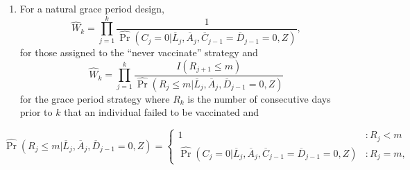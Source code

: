 \begin{appendices}
\begin{refsection}
\begin{enumerate}
\begin{enumerate}
\begin{enumerate}
                \item For a natural grace period design,
                $$\widehat{W}_k = \prod_{j = 1}^k \frac{1}{\widehat{\Pr}(C_j  = 0|\overline{L}_j, \overline{A}_j, \overline{C}_{j-1} = \overline{D}_{j-1} = 0, Z)},$$
                for those assigned to the ``never vaccinate'' strategy and
                $$\widehat{W}_k = \prod_{j = 1}^k \frac{I(R_{j+1} \leq m)}{\widehat{\Pr}(R_j \leq m | \overline{L}_j, \overline{A}_j, \overline{D}_{j-1} = 0, Z)}$$
                for the grace period strategy where $R_k$ is the number of consecutive days prior to $k$ that an individual failed to be vaccinated and
            \end{enumerate}
            $$\widehat{\Pr}(R_j \leq m | \overline{L}_j, \overline{A}_j, \overline{D}_{j-1} = 0, Z) = \begin{cases}
                1 & : R_j < m\\
                \widehat{\Pr}(C_j  = 0|\overline{L}_j, \overline{A}_j, \overline{C}_{j-1} = \overline{D}_{j-1} = 0, Z) & : R_j = m,
            \end{cases}$$
        \end{enumerate}


\end{enumerate}
\end{refsection}
\end{appendices}
